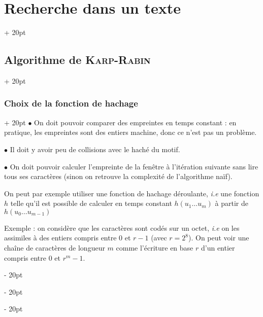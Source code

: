 \documentclass[a4paper, 12pt, twoside]{article}
\newcommand{\ind}[1][20pt]{\advance\leftskip + #1}
\newcommand{\deind}[1][20pt]{\advance\leftskip - #1}
\newenvironment{indt}[2][20pt]{#2 \par \ind[#1]}{\par \deind} %
\begin{document}
\begin{indt}{\section{Recherche dans un texte}}
\begin{indt}{\subsection{Algorithme de \textsc{Karp-Rabin}}}
\begin{indt}{\subsubsection{Choix de la fonction de hachage}}
                $\bullet$ On doit pouvoir comparer des empreintes en temps constant : en pratique, les empreintes sont des entiers machine, donc ce n'est pas un problème.

                $\bullet$ Il doit y avoir peu de collisions avec le haché du motif.

                $\bullet$ On doit pouvoir calculer l'empreinte de la fenêtre à l'itération suivante sans lire tous ses caractères (sinon on retrouve la complexité de l'algorithme naïf).

                On peut par exemple utiliser une fonction de hachage déroulante, \textit{i.e} une fonction $h$ telle qu'il est possible de calculer en temps constant $h(u_1 \ldots u_m)$ à partir de $h(u_0 \ldots u_{m - 1})$

                \begin{center}
                \end{center}

                Exemple : on considère que les caractères sont codés sur un octet, \textit{i.e} on les assimiles à des entiers compris entre 0 et $r - 1$ (avec $r = 2^8$).
                On peut voir une chaîne de caractères de longueur $m$ comme l'écriture en base $r$ d'un entier compris entre 0 et $r^m - 1$.


\end{indt}
\end{indt}
\end{indt}
\end{document}
